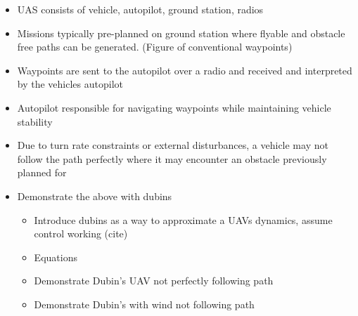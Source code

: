 \documentclass[conf]{new-aiaa}
\begin{document}
	
\begin{itemize}
	\item UAS consists of vehicle, autopilot, ground station, radios
	\item Missions typically pre-planned on ground station where flyable and obstacle free paths can be generated. (Figure of conventional waypoints)
	\item Waypoints are sent to the autopilot over a radio and received and interpreted by the vehicles autopilot
	\item Autopilot responsible for navigating waypoints while maintaining vehicle stability
	\item Due to turn rate constraints or external disturbances, a vehicle may not follow the path perfectly where it may encounter an obstacle previously planned for
	\item Demonstrate the above with dubins
	\begin{itemize}
		\item Introduce dubins as a way to approximate a UAVs dynamics, assume control working (cite)
		\item Equations
		\item Demonstrate Dubin's UAV not perfectly following path
		\item Demonstrate Dubin's with wind not following path
	\end{itemize}
\end{itemize}
\end{document}
